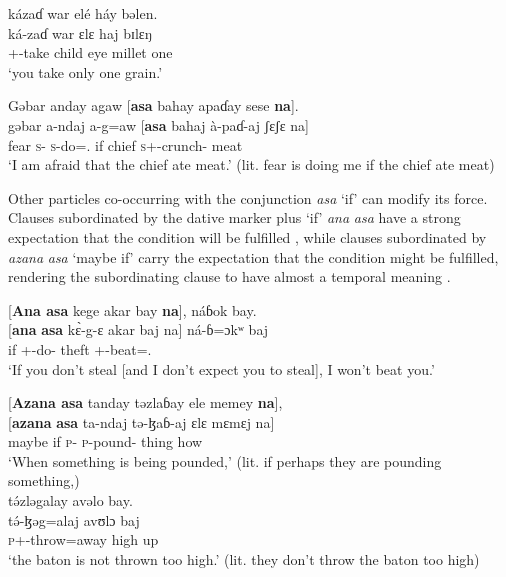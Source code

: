 \medskip
kázaɗ  war  elé  háy  bəlen.\\
\gll ká-zaɗ war ɛlɛ haj bɪlɛŋ\\
     {\twoS}+{\IFV}-take  child eye  millet  one\\
\glt  ‘you take only one grain.’
\z  

\ea \label{ex:12:48}
Gəbar  anday  agaw  [\textbf{asa}  bahay  apaɗay  sese  \textbf{na}].\\
\gll  gəbar  a-ndaj    a-g=aw    [\textbf{asa}  bahaj   à-paɗ-aj  ʃɛʃɛ   na]\\
      fear    \textsc{s}-{\PROG}  \textsc{s}-do={\oneS}.{\IO}  if  chief  \textsc{s}+{\PFV}-crunch{}-{\CL}  meat  {\PSP}\\
\glt  ‘I am afraid that the chief ate meat.’ (lit. fear is doing me if the chief ate meat)  
\z 

Other particles co-occurring with the conjunction \textit{asa} ‘if’ can modify its force. Clauses subordinated by the dative marker plus ‘if’ \textit{ana} \textit{asa} have a strong  expectation that the condition will be fulfilled , while clauses subordinated by \textit{azana} \textit{asa} ‘maybe if’ carry the expectation that the condition might be fulfilled, rendering the subordinating clause to have almost a temporal meaning . 

\ea \label{ex:12:49}
 [\textbf{Ana  asa} kege  akar  bay  \textbf{na}],  náɓok bay. \\
\gll  {}[\textbf{ana} \textbf{asa} k\`{ɛ}-g-ɛ    akar  baj  na]  ná-ɓ=ɔkʷ    baj\\
      {\DAT} if  {\twoS}+{\PFV}-do-{\CL}  theft  {\NEG}  {\PSP}  {\oneS}+{\IFV}-beat={\twoS}.{\IO}  {\NEG}\\
\glt  ‘If you don’t steal [and I don’t expect you to steal], I won’t beat you.’
\z 

\ea \label{ex:12:50}
{}[\textbf{Azana  asa}  tanday  təzlaɓay  ele  memey  \textbf{na}],\\  
\gll  {}[\textbf{azana} \textbf{asa}     ta-ndaj    tə-ɮaɓ-aj    ɛlɛ    mɛmɛj   na]\\  
      maybe    if         \textsc{p}-{\PROG}  \textsc{p}-pound{}-{\CL}   thing   how      {\PSP} \\    
\glt ‘When something is being pounded,’ (lit. if perhaps they are pounding something,)\\

\medskip
t\'{ə}zləgalay  avəlo  bay.\\
\gll t\'{ə}-ɮəg=alaj avʊlɔ baj\\
      \textsc{p}+{\IFV}-throw=away   {high up}  {\NEG}\\
\glt  ‘the baton is not thrown too high.’ (lit. they don’t throw the baton too high)
\z 

